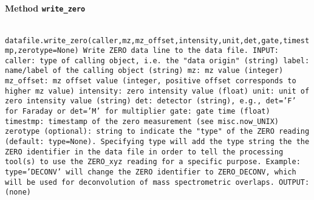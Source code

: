 \paragraph{Method \texttt{write_zero}}
\vspace{1ex}
\texttt{\newline
datafile.write_zero(caller,mz,mz_offset,intensity,unit,det,gate,timestmp,zerotype=None)\newline
\newline
Write ZERO data line to the data file.\newline
\newline
INPUT:\newline
caller: type of calling object, i.e. the "data origin" (string)\newline
label: name/label of the calling object (string)\newline
mz: mz value (integer)\newline
mz_offset: mz offset value (integer, positive offset corresponds to higher mz value)\newline
intensity: zero intensity value (float)\newline
unit: unit of zero intensity value (string)\newline
det: detector (string), e.g., det='F' for Faraday or det='M' for multiplier\newline
gate: gate time (float)\newline
timestmp: timestamp of the zero measurement (see misc.now_UNIX)\newline
zerotype (optional): string to indicate the "type" of the ZERO reading (default: type=None). Specifying type will add the type string the the ZERO identifier in the data file in order to tell the processing tool(s) to use the ZERO_xyz reading for a specific purpose. Example: type='DECONV' will change the ZERO identifier to ZERO_DECONV, which will be used for deconvolution of mass spectrometric overlaps.\newline
\newline
OUTPUT:\newline
(none)\newline
\newline
}

